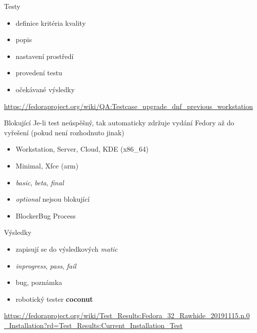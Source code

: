 \documentclass[12pt,aspectratio=169]{beamer}
\begin{document}
\begin{frame}{Testy}
	\begin{itemize}
		\item definice kritéria kvality
		\item popis
		\item nastavení prostředí
		\item provedení testu
		\item očekávané výsledky
	\end{itemize}

	\vspace{10pt}

{\small \url{https://fedoraproject.org/wiki/QA:Testcase_upgrade_dnf_previous_workstation}}
\end{frame}

\begin{frame}{Blokující}
	Je-li test neúspěšný, tak automaticky zdržuje vydání Fedory až do vyřešení (pokud není rozhodnuto jinak)
		
	\vspace{10pt}
	
	\begin{itemize}
		\item Workstation, Server, Cloud, KDE (x86\_64)
		\item Minimal, Xfce (arm)
		\item \textit{basic}, \textit{beta}, \textit{final}
		\item \textit{optional} nejsou blokující
		\item BlockerBug Process
	\end{itemize}
\end{frame}

\begin{frame}{Výsledky}
	\begin{itemize}
		\item zapisují se do výsledkových \textit{matic}
		\item \textit{inprogress}, \textit{pass}, \textit{fail}
		\item bug, poznámka
		\item robotický tester \textbf{coconut}
	\end{itemize}

	\vspace{10pt}

{\small \url{https://fedoraproject.org/wiki/Test_Results:Fedora_32_Rawhide_20191115.n.0_Installation?rd=Test_Results:Current_Installation_Test}}
\end{frame}
\end{document}
